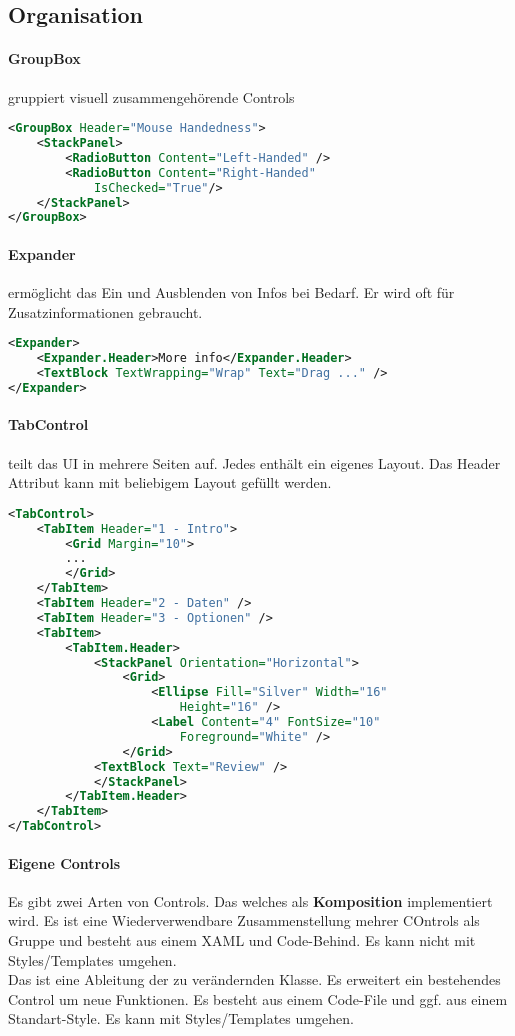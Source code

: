 \subsection{Organisation}
\paragraph{GroupBox} gruppiert visuell zusammengehörende Controls
\begin{lstlisting}[language=xml]
<GroupBox Header="Mouse Handedness">
    <StackPanel>
        <RadioButton Content="Left-Handed" />
        <RadioButton Content="Right-Handed"
            IsChecked="True"/>
    </StackPanel>
</GroupBox>
\end{lstlisting}
\paragraph{Expander} ermöglicht das Ein und Ausblenden von Infos bei Bedarf. Er wird oft für Zusatzinformationen gebraucht.
\begin{lstlisting}[language=xml]
<Expander>
    <Expander.Header>More info</Expander.Header>
    <TextBlock TextWrapping="Wrap" Text="Drag ..." />
</Expander>
\end{lstlisting}
\paragraph{TabControl} teilt das UI in mehrere Seiten auf. Jedes  enthält ein eigenes Layout. Das Header Attribut kann mit beliebigem Layout gefüllt werden.
\begin{lstlisting}[language=xml]
<TabControl>
    <TabItem Header="1 - Intro">
        <Grid Margin="10">
        ...
        </Grid>
    </TabItem>
    <TabItem Header="2 - Daten" />
    <TabItem Header="3 - Optionen" />
    <TabItem>
        <TabItem.Header>
            <StackPanel Orientation="Horizontal">
                <Grid>
                    <Ellipse Fill="Silver" Width="16"
                        Height="16" />
                    <Label Content="4" FontSize="10"
                        Foreground="White" />
                </Grid>
            <TextBlock Text="Review" />
            </StackPanel>
        </TabItem.Header>
    </TabItem>
</TabControl>
\end{lstlisting}
\paragraph{Eigene Controls} Es gibt zwei Arten von Controls. Das  welches als \textbf{Komposition} implementiert wird. Es ist eine Wiederverwendbare Zusammenstellung mehrer COntrols als Gruppe und besteht aus einem XAML und Code-Behind. Es kann nicht mit Styles/Templates umgehen.\\
Das  ist eine Ableitung der zu verändernden Klasse. Es erweitert ein bestehendes Control um neue Funktionen. Es besteht aus einem Code-File und ggf. aus einem Standart-Style. Es kann mit Styles/Templates umgehen.



